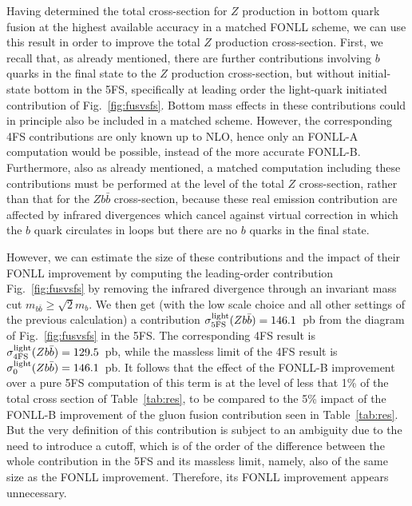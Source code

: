 \documentclass[12pt]{article}
\begin{document}
Having 
 determined the total cross-section for $Z$
production in bottom quark fusion at the highest available accuracy in
a matched FONLL scheme, we can use this result in
order to improve the total $Z$ production cross-section. First, we
recall that, as already mentioned, there are further contributions
involving $b$ quarks in the final state to the $Z$ production
cross-section, but without initial-state bottom in the 5FS,
specifically at leading order the light-quark initiated contribution of
Fig.~\ref{fig:fusvsfs}. Bottom mass effects in these contributions
could in principle also be included in a
matched scheme. However, the corresponding 4FS contributions are only
known up to NLO, hence only an FONLL-A computation would be possible,
instead of the more accurate FONLL-B. Furthermore, also as already
mentioned, a matched computation including these contributions must be
performed at the level of the total $Z$ cross-section, rather than
that for  the $Zb\bar b$ cross-section, because these real emission
contribution 
are affected by infrared divergences which cancel against virtual
correction in which the $b$ quark circulates in loops but there are no
$b$ quarks in the final state. 

However, we can estimate the size of these contributions and the
impact of their FONLL improvement by computing
the leading-order contribution Fig.~\ref{fig:fusvsfs} by removing the
infrared divergence through  an
invariant mass cut $m_{b\bar b}\ge \sqrt{2} m_b$. We then get (with the
low scale choice and all other settings of the previous calculation) a
contribution $\sigma^{\rm light}_{\rm 5FS}(Zb\bar b)=146.1$~pb from the diagram
of Fig.~\ref{fig:fusvsfs} in the 5FS. The corresponding 4FS result is 
$\sigma^{\rm light}_{\rm 4FS}(Zb\bar b)=129.5$~pb, while the massless
limit of the 4FS result is $\sigma^{\rm light}_{\rm 0}(Zb\bar
b)=146.1$~pb. It follows that the effect of the FONLL-B improvement
over a pure 5FS computation of this term is at the level of less that
1\% of the total cross section of Table~\ref{tab:res}, to be compared
to the 5\%  impact of the FONLL-B improvement of the gluon fusion
contribution seen in  Table~\ref{tab:res}. But the very
definition of this contribution is subject to an ambiguity due to the
need to introduce a cutoff, which is of the order of the difference
between the whole contribution in the 5FS 
and its massless limit, namely, also of
the same size as the FONLL improvement. Therefore, its FONLL
improvement appears unnecessary. 
\end{document}
